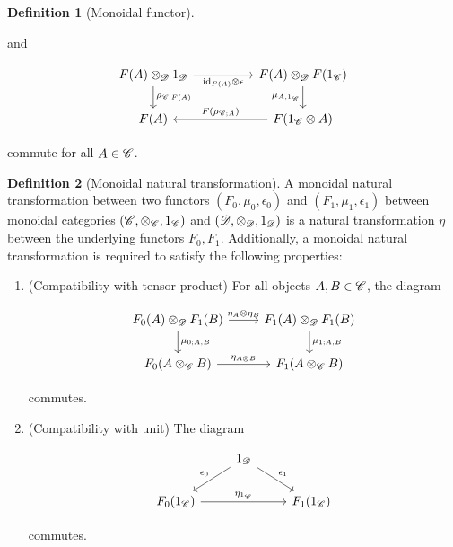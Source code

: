 \documentclass{article}
\theoremstyle{definition}
\newtheorem*{definition}{Definition}
\numberwithin{figure}{section}
\begin{document}
\begin{definition}[Monoidal functor]
\begin{enumerate}
and

\[\begin{tikzcd}
	{F(A)\otimes_{\Dcat}1_{\Dcat}} && {F(A)\otimes_{\Dcat}F(1_{\Ccat})} \\
	{F(A)} && {F(1_{\Ccat}\otimes A)}
	\arrow["{\rho_{\Ccat;F(A)}}", from=1-1, to=2-1]
	\arrow["{F(\rho_{\Ccat;A})}"', from=2-3, to=2-1]
	\arrow["{\mu_{A,1_{\Ccat}}}"', from=1-3, to=2-3]
	\arrow["{\id_{F(A)}\otimes\epsilon}"', from=1-1, to=1-3]
\end{tikzcd}\]

commute for all $A\in \mathscr{C}$.
\end{enumerate}

\raggedleft\qedsymbol{}
\end{definition}

\begin{definition}[Monoidal natural transformation] A monoidal natural transformation between two functors $(F_0,\mu_0,\epsilon_0)$ and $(F_1,\mu_1,\epsilon_1)$ between monoidal categories $(\mathscr{C},\otimes_{\mathscr{C}},1_{\mathscr{C}})$ and $(\mathscr{D},\otimes_{\mathscr{D}},1_{\mathscr{D}})$ is a natural transformation $\eta$ between the underlying functors $F_0,F_1$. Additionally, a monoidal natural transformation is required to satisfy the following properties:

\begin{enumerate}
\item (Compatibility with tensor product) For all objects $A,B\in \mathscr{C}$, the diagram

\[\begin{tikzcd}
	{F_0(A)\otimes_{\Dcat}F_1(B)} & {F_1(A)\otimes_{\Dcat}F_1(B)} \\
	{F_0(A\otimes_{\Ccat} B)} & {F_1(A\otimes_{\Ccat} B)}
	\arrow["{\mu_{0;A,B}}", from=1-1, to=2-1]
	\arrow["{\mu_{1;A,B}}", from=1-2, to=2-2]
	\arrow["{\eta_A\otimes \eta_B}", from=1-1, to=1-2]
	\arrow["{\eta_{A\otimes B}}", from=2-1, to=2-2]
\end{tikzcd}\]

commutes.

\item (Compatibility with unit) The diagram

\[\begin{tikzcd}
	& {1_{\Dcat}} \\
	{F_0(1_{\Ccat})} && {F_1(1_{\Ccat})}
	\arrow["{\eta_{1_{\Ccat}}}", from=2-1, to=2-3]
	\arrow["{\epsilon_0}"', from=1-2, to=2-1]
	\arrow["{\epsilon_1}", from=1-2, to=2-3]
\end{tikzcd}\]

commutes.
\end{enumerate}
\raggedleft\qedsymbol{}
\end{definition}
\end{document}
